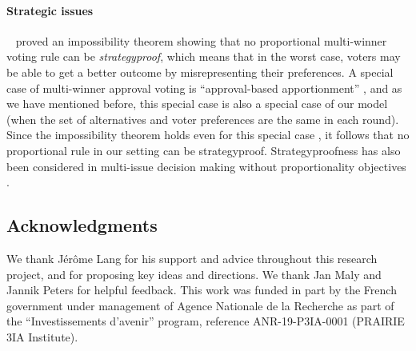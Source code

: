 \documentclass[10pt]{scrartcl}
\theoremstyle{plain}
\theoremstyle{definition}
\begin{document}
\paragraph{Strategic issues}\ \!
\citet{peters2018proportionality} proved an impossibility theorem showing that no proportional multi-winner voting rule can be \emph{strategyproof}, which means that in the worst case, voters may be able to get a better outcome by misrepresenting their preferences. A special case of multi-winner approval voting is ``approval-based apportionment'' \citep{approvalbasedapportionment, airiau2023portioning}, and as we have mentioned before, this special case is also a special case of our model (when the set of alternatives and voter preferences are the same in each round). Since the impossibility theorem holds even for this special case \citep{delemazure2022strategyproofness, freeriding2023}, it follows that no proportional rule in our setting can be strategyproof. Strategyproofness has also been considered in multi-issue decision making without proportionality objectives \citep{amanatidis2015multiple,barrot2017manipulation}.

%
 
\subsection*{Acknowledgments}
We thank J\'er\^ome Lang for his support and advice throughout this research project, and for proposing key ideas and directions. We thank Jan Maly and Jannik Peters for helpful feedback. This work was funded in part by the French government under management of Agence Nationale de la Recherche as part of the ``Investissements d'avenir'' program, reference ANR-19-P3IA-0001 (PRAIRIE 3IA Institute). 
\end{document}
